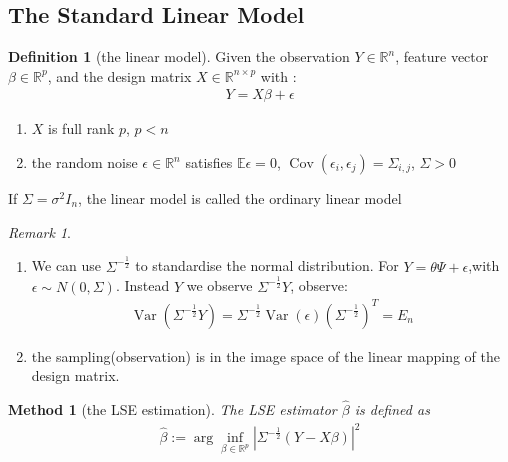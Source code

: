 \documentclass[a4paper,12pt, oneside, fleqn]{book}
\newtheorem{method}[theorem]{Method}
\theoremstyle{definition}
\newtheorem{definition}{Definition}[section]
\theoremstyle{remark}
\newtheorem*{remark}{Remark}
\DeclareMathOperator{\var}{Var}
\DeclareMathOperator{\cov}{Cov}
\begin{document}
\subsection{The Standard Linear Model}
\begin{definition}[the linear model]\label{model: linear}
Given the observation $Y \in \mathbb{R}^n$, feature vector $\beta \in \mathbb{R}^p$, and the design matrix $X \in \mathbb{R}^{n \times p}$  with  :
\begin{align*}
	Y = X \beta + \epsilon 
\end{align*}
\begin{enumerate}
	\item $X$ is full rank $p$, $p < n$
	\item the random noise $\epsilon \in \mathbb{R}^n$ satisfies  $\mathbb{E}\epsilon = 0$, $ \cov(\epsilon_i, \epsilon_j) = \Sigma_{i, j}$, $\Sigma > 0$
\end{enumerate}
If $\Sigma = \sigma^2 I_n$, the linear model is called the ordinary linear model
\end{definition}
\begin{remark}\quad
\begin{enumerate}
	\item We can use $\Sigma^{-\frac{1}{2} }$ to standardise the normal distribution. For $Y = \theta \Psi + \epsilon$,with $\epsilon \sim N(0, \Sigma)$. Instead $Y$ we observe $\Sigma^{-\frac{1}{2}} Y$, observe:
	\begin{align*}
		\var(\Sigma^{-\frac{1}{2}}Y) = \Sigma^{-\frac{1}{2}}\var(\epsilon)(\Sigma^{-\frac{1}{2}})^T = E_n
	\end{align*}
    \item the sampling(observation) is in the image space of the linear mapping of the design matrix.
\end{enumerate}
\end{remark}

\begin{method}[the LSE estimation]
	The LSE estimator $\hat{\beta}$ is defined as
	\begin{align*}
		\hat{\beta}:= \arg\inf_{\beta \in \mathbb{R}^p}|\Sigma^{-\frac{1}{2}}(Y - X\beta)|^2
	\end{align*}
\end{method}
\end{document}

